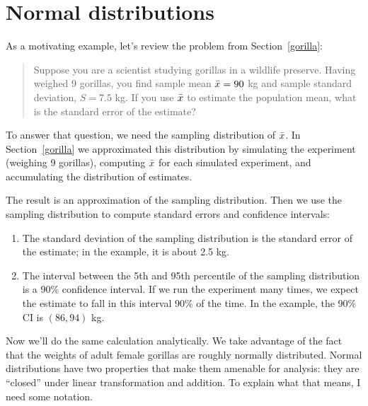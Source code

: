 \documentclass[12pt]{book}
\begin{document}
\section{Normal distributions}
\label{why_normal}

As a motivating example, let's review the problem from
Section~\ref{gorilla}:

\begin{quotation}
\noindent Suppose you are a scientist studying gorillas in a wildlife
preserve.  Having weighed 9 gorillas, you find sample mean $\bar{x}=90$ kg and
sample standard deviation, $S=7.5$ kg.  If you use $\bar{x}$ to estimate
the population mean, what is the standard error of the estimate?
\end{quotation}

To answer that question, we need the sampling
distribution of $\bar{x}$.  In Section~\ref{gorilla} we approximated
this distribution by simulating the experiment (weighing
9 gorillas), computing $\bar{x}$ for each simulated experiment, and
accumulating the distribution of estimates.

The result is an approximation of the sampling distribution.  Then we
use the sampling distribution to compute standard errors and
confidence intervals:

\begin{enumerate}

\item The standard deviation of the sampling distribution is the
  standard error of the estimate; in the example, it is about
  2.5 kg.

\item The interval between the 5th and 95th percentile of the sampling
  distribution is a 90\% confidence interval.  If we run the
  experiment many times, we expect the estimate to fall in this
  interval 90\% of the time.  In the example, the 90\% CI is
  $(86, 94)$ kg.

\end{enumerate}

Now we'll do the same calculation analytically.  We
take advantage of the fact that the weights of adult female gorillas
are roughly normally distributed.  Normal distributions have two
properties that make them amenable for analysis: they are ``closed'' under
linear transformation and addition.  To explain what that means, I
need some notation.  
\end{document}
